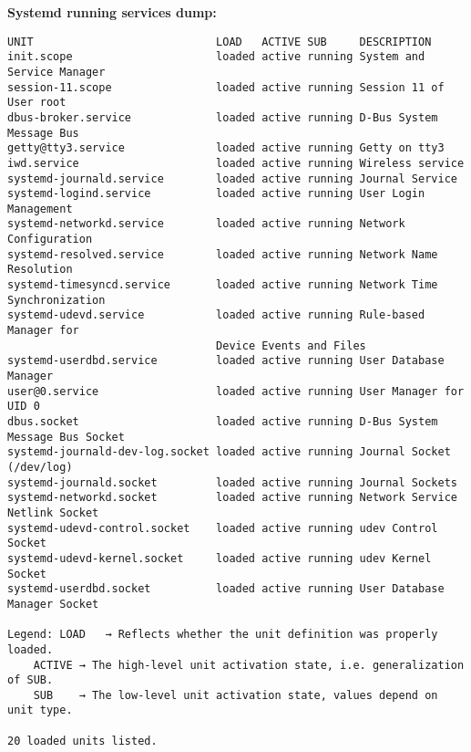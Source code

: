 \textbf{Systemd running services dump:}
\begin{verbatim}
UNIT                            LOAD   ACTIVE SUB     DESCRIPTION
init.scope                      loaded active running System and Service Manager
session-11.scope                loaded active running Session 11 of User root
dbus-broker.service             loaded active running D-Bus System Message Bus
getty@tty3.service              loaded active running Getty on tty3
iwd.service                     loaded active running Wireless service
systemd-journald.service        loaded active running Journal Service
systemd-logind.service          loaded active running User Login Management
systemd-networkd.service        loaded active running Network Configuration
systemd-resolved.service        loaded active running Network Name Resolution
systemd-timesyncd.service       loaded active running Network Time Synchronization
systemd-udevd.service           loaded active running Rule-based Manager for
    	    	    	    	Device Events and Files
systemd-userdbd.service         loaded active running User Database Manager
user@0.service                  loaded active running User Manager for UID 0
dbus.socket                     loaded active running D-Bus System Message Bus Socket
systemd-journald-dev-log.socket loaded active running Journal Socket (/dev/log)
systemd-journald.socket         loaded active running Journal Sockets
systemd-networkd.socket         loaded active running Network Service Netlink Socket
systemd-udevd-control.socket    loaded active running udev Control Socket
systemd-udevd-kernel.socket     loaded active running udev Kernel Socket
systemd-userdbd.socket          loaded active running User Database Manager Socket

Legend: LOAD   → Reflects whether the unit definition was properly loaded.
    ACTIVE → The high-level unit activation state, i.e. generalization of SUB.
    SUB    → The low-level unit activation state, values depend on unit type.

20 loaded units listed.
\end{verbatim}

